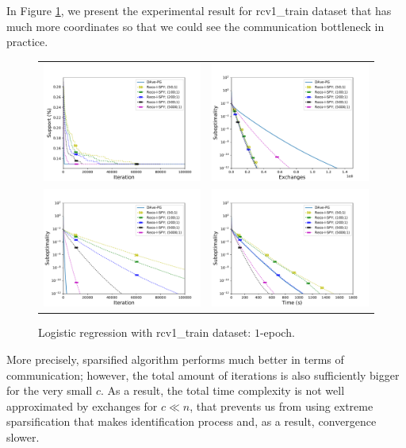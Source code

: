 In Figure \ref{fig:rcv1_1epoch}, we present the experimental result for rcv1\_train dataset that has much more coordinates so that we could see the communication bottleneck in practice. 
\begin{figure}[h!]
\begin{tabular}{cc}
\includegraphics[width = 0.49\linewidth]{spy/figs/rcv1_train_20w_0001_00001_density.pdf}&
\includegraphics[width = 0.49\linewidth]{spy/figs/rcv1_train_20w_0001_00001_fun_vs_ex_log_coordinate.pdf}\\
\includegraphics[width = 0.49\linewidth]{spy/figs/rcv1_train_20w_0001_00001_fun_vs_ite_log_coordinate.pdf}&
\includegraphics[width = 0.49\linewidth]{spy/figs/rcv1_train_20w_0001_00001_fun_vs_time_log.pdf}
\end{tabular}
\caption{Logistic regression with rcv1\_train dataset: $1$-epoch.}
\label{fig:rcv1_1epoch}
\end{figure}
More precisely, sparsified algorithm performs much better in terms of communication; however, the total amount of iterations is also sufficiently bigger for the very small $c$. As a result, the total time complexity is not well approximated by exchanges for $c\ll n$, that prevents us from using extreme sparsification that makes identification process and, as a result, convergence slower.


